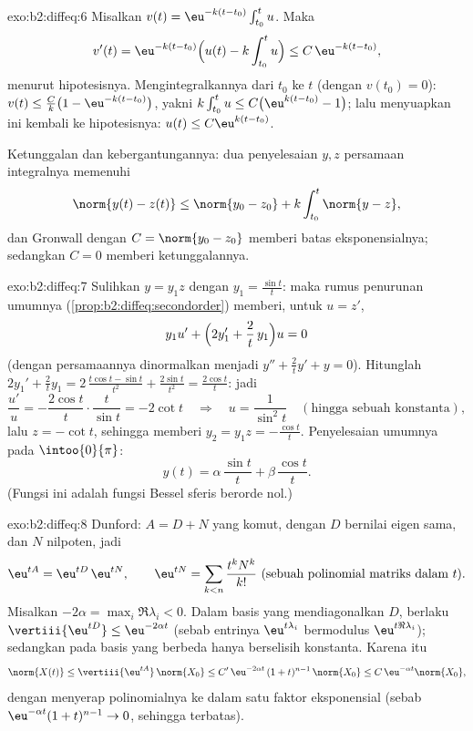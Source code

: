 \begin{solution}{exo:b2:diffeq:6}
Misalkan $v(t) = \eu^{-k(t - t_0)}\int_{t_0}^t u$. Maka
\[
v'(t) = \eu^{-k(t-t_0)}\Bigl(u(t) - k\int_{t_0}^t u\Bigr)
\leq C\,\eu^{-k(t-t_0)},
\]
menurut hipotesisnya. Mengintegralkannya dari $t_0$ ke $t$ (dengan $v(t_0) = 0$):
$v(t) \leq \frac{C}{k}\bigl(1 - \eu^{-k(t - t_0)}\bigr)$, yakni
$k\int_{t_0}^t u \leq C\bigl(\eu^{k(t-t_0)} - 1\bigr)$; lalu menyuapkan
ini kembali ke hipotesisnya: $u(t) \leq C\eu^{k(t-t_0)}$.

Ketunggalan dan kebergantungannya: dua penyelesaian $y, z$ persamaan
integralnya memenuhi
\[
\norm{y(t) - z(t)} \leq \norm{y_0 - z_0} +
k\int_{t_0}^{t}\norm{y - z},
\]
dan Gronwall dengan $C = \norm{y_0 - z_0}$ memberi batas
eksponensialnya; sedangkan $C = 0$ memberi ketunggalannya.
\end{solution}

\begin{solution}{exo:b2:diffeq:7}
Sulihkan $y = y_1 z$ dengan $y_1 = \frac{\sin t}{t}$: maka rumus
penurunan umumnya (\cref{prop:b2:diffeq:secondorder}) memberi, untuk $u
= z'$,
\[
y_1 u' + \Bigl(2y_1' + \frac{2}{t}\,y_1\Bigr)u = 0
\]
(dengan persamaannya dinormalkan menjadi $y'' + \frac2t y' + y = 0$). Hitunglah
$2y_1' + \frac2t y_1 = 2\,\frac{t\cos t - \sin t}{t^2} +
\frac{2\sin t}{t^2} = \frac{2\cos t}{t}$: jadi
\[
\frac{u'}{u} = -\frac{2\cos t}{t}\cdot\frac{t}{\sin t}
= -2\cot t
\quad\Longrightarrow\quad
u = \frac{1}{\sin^2 t}
\quad (\text{hingga sebuah konstanta}),
\]
lalu $z = -\cot t$, sehingga memberi $y_2 = y_1 z = -\frac{\cos t}{t}$.
Penyelesaian umumnya pada $\intoo{0}{\pi}$:
\[
y(t) = \alpha\,\frac{\sin t}{t} + \beta\,\frac{\cos t}{t} .
\]
(Fungsi ini adalah fungsi Bessel sferis berorde nol.)
\end{solution}

\begin{solution}{exo:b2:diffeq:8}
Dunford: $A = D + N$ yang komut, dengan $D$  bernilai eigen
sama, dan $N$ nilpoten, jadi
\[
\eu^{tA} = \eu^{tD}\,\eu^{tN},
\qquad
\eu^{tN} = \sum_{k < n} \frac{t^kN^k}{k!}
\ \text{(sebuah polinomial matriks dalam } t).
\]
Misalkan $-2\alpha = \max_i \Re\lambda_i < 0$. Dalam basis yang mendiagonalkan
$D$, berlaku $\vertiii{\eu^{tD}} \leq \eu^{-2\alpha t}$ (sebab entrinya
$\eu^{t\lambda_i}$ bermodulus $\eu^{t\Re\lambda_i}$); sedangkan  pada
basis yang berbeda hanya berselisih konstanta. Karena itu
\[
\norm{X(t)} \leq \vertiii{\eu^{tA}}\,\norm{X_0}
\leq C'\,\eu^{-2\alpha t}\,(1 + t)^{n-1}\,\norm{X_0}
\leq C\,\eu^{-\alpha t}\norm{X_0} ,
\]
dengan menyerap polinomialnya ke dalam satu faktor eksponensial
(sebab $\eu^{-\alpha t}(1+t)^{n-1} \to 0$, sehingga terbatas).
\end{solution}

